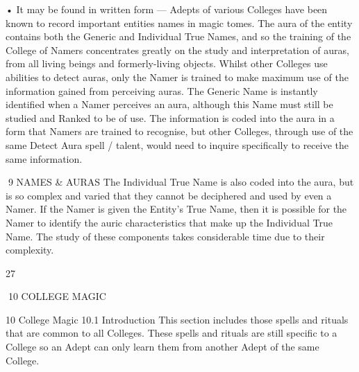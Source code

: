 \documentclass[a4paper]{article}
\begin{document}
\begin{multicols}{3}
• It may be found in written form — Adepts of
various Colleges have been known to record important entities names in magic tomes.
The aura of the entity contains both the Generic
and Individual True Names, and so the training of
the College of Namers concentrates greatly on the
study and interpretation of auras, from all living
beings and formerly-living objects. Whilst other
Colleges use abilities to detect auras, only the
Namer is trained to make maximum use of the
information gained from perceiving auras. The
Generic Name is instantly identified when a Namer
perceives an aura, although this Name must still be
studied and Ranked to be of use. The information
is coded into the aura in a form that Namers are
trained to recognise, but other Colleges, through
use of the same Detect Aura spell / talent, would
need to inquire specifically to receive the same
information.

9 NAMES & AURAS
The Individual True Name is also coded into the
aura, but is so complex and varied that they cannot
be deciphered and used by even a Namer. If the
Namer is given the Entity’s True Name, then it is
possible for the Namer to identify the auric characteristics that make up the Individual True Name.
The study of these components takes considerable
time due to their complexity.

27

10 COLLEGE MAGIC

10 College Magic
10.1 Introduction
This section includes those spells and rituals that
are common to all Colleges. These spells and rituals are still specific to a College so an Adept can
only learn them from another Adept of the same
College.


\end{multicols}
\end{document}
